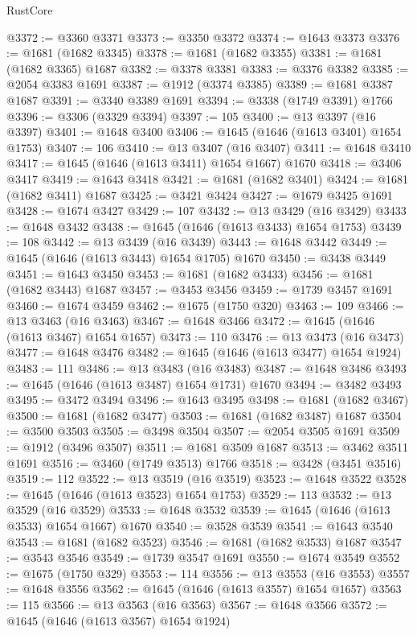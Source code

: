 \begin{lexlean}{RustCore}
\begin{coremodule}
@3372 := @3360 @3371
@3373 := @3350 @3372
@3374 := @1643 @3373
@3376 := @1681 (@1682 @3345)
@3378 := @1681 (@1682 @3355)
@3381 := @1681 (@1682 @3365) @1687
@3382 := @3378 @3381
@3383 := @3376 @3382
@3385 := @2054 @3383 @1691
@3387 := @1912 (@3374 @3385)
@3389 := @1681 @3387 @1687
@3391 := @3340 @3389 @1691
@3394 := @3338 (@1749 @3391) @1766
@3396 := @3306 (@3329 @3394)
@3397 := 105
@3400 := @13 @3397 (@16 @3397)
@3401 := @1648 @3400
@3406 := @1645 (@1646 (@1613 @3401) @1654 @1753)
@3407 := 106
@3410 := @13 @3407 (@16 @3407)
@3411 := @1648 @3410
@3417 := @1645 (@1646 (@1613 @3411) @1654 @1667) @1670
@3418 := @3406 @3417
@3419 := @1643 @3418
@3421 := @1681 (@1682 @3401)
@3424 := @1681 (@1682 @3411) @1687
@3425 := @3421 @3424
@3427 := @1679 @3425 @1691
@3428 := @1674 @3427
@3429 := 107
@3432 := @13 @3429 (@16 @3429)
@3433 := @1648 @3432
@3438 := @1645 (@1646 (@1613 @3433) @1654 @1753)
@3439 := 108
@3442 := @13 @3439 (@16 @3439)
@3443 := @1648 @3442
@3449 := @1645 (@1646 (@1613 @3443) @1654 @1705) @1670
@3450 := @3438 @3449
@3451 := @1643 @3450
@3453 := @1681 (@1682 @3433)
@3456 := @1681 (@1682 @3443) @1687
@3457 := @3453 @3456
@3459 := @1739 @3457 @1691
@3460 := @1674 @3459
@3462 := @1675 (@1750 @320)
@3463 := 109
@3466 := @13 @3463 (@16 @3463)
@3467 := @1648 @3466
@3472 := @1645 (@1646 (@1613 @3467) @1654 @1657)
@3473 := 110
@3476 := @13 @3473 (@16 @3473)
@3477 := @1648 @3476
@3482 := @1645 (@1646 (@1613 @3477) @1654 @1924)
@3483 := 111
@3486 := @13 @3483 (@16 @3483)
@3487 := @1648 @3486
@3493 := @1645 (@1646 (@1613 @3487) @1654 @1731) @1670
@3494 := @3482 @3493
@3495 := @3472 @3494
@3496 := @1643 @3495
@3498 := @1681 (@1682 @3467)
@3500 := @1681 (@1682 @3477)
@3503 := @1681 (@1682 @3487) @1687
@3504 := @3500 @3503
@3505 := @3498 @3504
@3507 := @2054 @3505 @1691
@3509 := @1912 (@3496 @3507)
@3511 := @1681 @3509 @1687
@3513 := @3462 @3511 @1691
@3516 := @3460 (@1749 @3513) @1766
@3518 := @3428 (@3451 @3516)
@3519 := 112
@3522 := @13 @3519 (@16 @3519)
@3523 := @1648 @3522
@3528 := @1645 (@1646 (@1613 @3523) @1654 @1753)
@3529 := 113
@3532 := @13 @3529 (@16 @3529)
@3533 := @1648 @3532
@3539 := @1645 (@1646 (@1613 @3533) @1654 @1667) @1670
@3540 := @3528 @3539
@3541 := @1643 @3540
@3543 := @1681 (@1682 @3523)
@3546 := @1681 (@1682 @3533) @1687
@3547 := @3543 @3546
@3549 := @1739 @3547 @1691
@3550 := @1674 @3549
@3552 := @1675 (@1750 @329)
@3553 := 114
@3556 := @13 @3553 (@16 @3553)
@3557 := @1648 @3556
@3562 := @1645 (@1646 (@1613 @3557) @1654 @1657)
@3563 := 115
@3566 := @13 @3563 (@16 @3563)
@3567 := @1648 @3566
@3572 := @1645 (@1646 (@1613 @3567) @1654 @1924)

\end{coremodule}
\end{lexlean}
